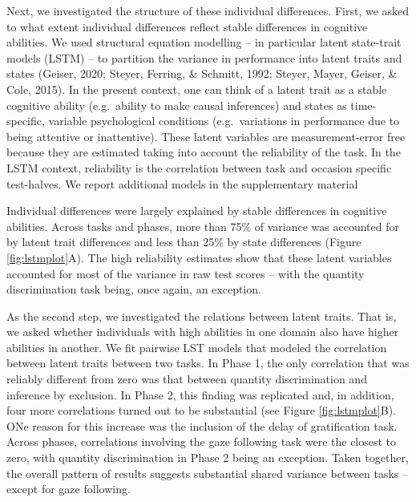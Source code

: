 \documentclass[
  man,floatsintext]{apa6}
\begin{document}
Next, we investigated the structure of these individual differences. First, we asked to what extent individual differences reflect stable differences in cognitive abilities. We used structural equation modelling -- in particular latent state-trait models (LSTM) -- to partition the variance in performance into latent traits and states (Geiser, 2020; Steyer, Ferring, \& Schmitt, 1992; Steyer, Mayer, Geiser, \& Cole, 2015). In the present context, one can think of a latent trait as a stable cognitive ability (e.g.~ability to make causal inferences) and states as time-specific, variable psychological conditions (e.g.~variations in performance due to being attentive or inattentive). These latent variables are measurement-error free because they are estimated taking into account the reliability of the task. In the LSTM context, reliability is the correlation between task and occasion specific test-halves. We report additional models in the supplementary material

Individual differences were largely explained by stable differences in cognitive abilities. Across tasks and phases, more than 75\% of variance was accounted for by latent trait differences and less than 25\% by state differences (Figure \ref{fig:lstmplot}A). The high reliability estimates show that these latent variables accounted for most of the variance in raw test scores -- with the quantity discrimination task being, once again, an exception.

As the second step, we investigated the relations between latent traits. That is, we asked whether individuals with high abilities in one domain also have higher abilities in another. We fit pairwise LST models that modeled the correlation between latent traits between two tasks. In Phase 1, the only correlation that was reliably different from zero was that between quantity discrimination and inference by exclusion. In Phase 2, this finding was replicated and, in addition, four more correlations turned out to be substantial (see Figure \ref{fig:lstmplot}B). ONe reason for this increase was the inclusion of the delay of gratification task. Across phases, correlations involving the gaze following task were the closest to zero, with quantity discrimination in Phase 2 being an exception. Taken together, the overall pattern of results suggests substantial shared variance between tasks -- except for gaze following.
\end{document}

